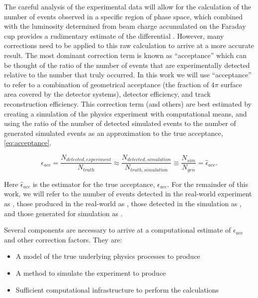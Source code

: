 The careful analysis of the experimental data will allow for the calculation of the number of events observed in a specific region of phase space, which combined with the luminosity determined from beam charge accumulated on the Faraday cup provides a rudimentary estimate of the differential \xsec. However, many corrections need to be applied to this raw calculation to arrive at a more accurate result. The most dominant correction term is known as ``acceptance'' which can be thought of the ratio of the number of events that are experimentally detected relative to the number that truly occurred. In this work we will use ``acceptance'' to refer to a combination of geometrical acceptance (the fraction of 4$\pi$ surface area covered by the detector systems), detector efficiency, and track reconstruction efficiency. This correction term (and others) are best estimated by creating a simulation of the physics experiment with computational means, and using the ratio of the number of detected simulated events to the number of generated simulated events as an approximation to the true acceptance, \eqref{eq:acceptance}. 

\begin{equation}\label{eq:acceptance}
    \epsilon_{acc} = \frac{N_{detected,experiment}}{N_{truth}} \approx  \frac{N_{detected,simulation}}{N_{truth,simulation}}  \equiv \frac{N_{sim}}{N_{gen}} = \hat{\epsilon}_{acc}.
\end{equation}

Here $\hat{\epsilon}_{acc}$ is the estimator for the true acceptance, $\epsilon_{acc}$. For the remainder of this work, we will refer to the number of events detected in the real-world experiment as \Nexp, those produced in the real-world as \Ntruth, those detected in the simulation as \Nsim, and those generated for simulation as \Ngen.  

Several components are necessary to arrive at a computational estimate of $\epsilon_{acc}$ and other correction factors. They are: 

\begin{itemize}
    \item A model of the true underlying physics processes to produce \Ngen {}
    \item A method to simulate the experiment to produce \Nsim {}
    \item Sufficient computational infrastructure to perform the calculations 
\end{itemize}



